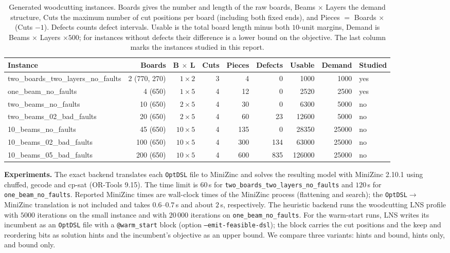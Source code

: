 \documentclass[11pt,a4paper]{article}
\begin{document}
\begin{table}[t]
\centering
\footnotesize
\caption{Generated woodcutting instances. Boards gives the number and length
of the raw boards, Beams $\times$ Layers the demand structure, Cuts the
maximum number of cut positions per board (including both fixed ends), and
Pieces $=$ Boards $\times$ (Cuts $- 1$). Defects counts defect intervals.
Usable is the total board length minus both $10$-unit margins, Demand is
Beams $\times$ Layers $\times 500$; for instances without defects their
difference is a lower bound on the objective. The last column marks the
instances studied in this report.}
\label{tab:woodcutting-instances}
\setlength{\tabcolsep}{3.5pt}
\begin{tabular}{@{}lrrrrrrrl@{}}
\toprule
Instance & Boards & B $\times$ L & Cuts & Pieces & Defects & Usable & Demand & Studied \\
\midrule
two\_boards\_two\_layers\_no\_faults & 2 (770, 270) & $1 \times 2$ & 3 & 4 & 0 & 1000 & 1000 & yes \\
one\_beam\_no\_faults & 4 (650) & $1 \times 5$ & 4 & 12 & 0 & 2520 & 2500 & yes \\
two\_beams\_no\_faults & 10 (650) & $2 \times 5$ & 4 & 30 & 0 & 6300 & 5000 & no \\
two\_beams\_02\_bad\_faults & 20 (650) & $2 \times 5$ & 4 & 60 & 23 & 12600 & 5000 & no \\
10\_beams\_no\_faults & 45 (650) & $10 \times 5$ & 4 & 135 & 0 & 28350 & 25000 & no \\
10\_beams\_02\_bad\_faults & 100 (650) & $10 \times 5$ & 4 & 300 & 134 & 63000 & 25000 & no \\
10\_beams\_05\_bad\_faults & 200 (650) & $10 \times 5$ & 4 & 600 & 835 & 126000 & 25000 & no \\
\bottomrule
\end{tabular}
\end{table}

\textbf{Experiments.}
The exact backend translates each \texttt{OptDSL} file to MiniZinc and solves
the resulting model with MiniZinc 2.10.1 using chuffed, gecode and cp-sat
(OR-Tools 9.15).
The time limit is $60$\,s for \texttt{two\_boards\_two\_layers\_no\_faults}
and $120$\,s for \texttt{one\_beam\_no\_faults}.
Reported MiniZinc times are wall-clock times of the MiniZinc process
(flattening and search); the \texttt{OptDSL}$\to$MiniZinc translation is not
included and takes $0.6$--$0.7$\,s and about $2$\,s, respectively.
The heuristic backend runs the woodcutting LNS profile
with $5000$ iterations on the small instance and with $20\,000$ iterations on
\texttt{one\_beam\_no\_faults}.
For the warm-start runs, LNS writes its incumbent as an
\texttt{OptDSL} file with a \texttt{@warm\_start} block
(option \texttt{--emit-feasible-dsl}); the block carries the cut positions and
the keep and reordering bits as solution hints and the incumbent's objective
as an upper bound.
We compare three variants: hints and bound, hints only, and bound only.
\end{document}

